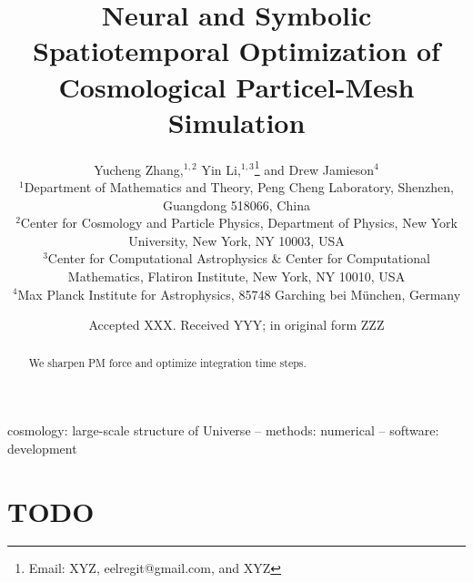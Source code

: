 \documentclass[usenatbib]{mnras}
\title[Spatiotemporally Optimized Simulation]
{Neural and Symbolic Spatiotemporal Optimization of Cosmological
Particel-Mesh Simulation}
\author[Zhang, Li, Jamieson, et al.]{
%
Yucheng Zhang,$^{1, 2}$
%
Yin Li,$^{1, 3}$\thanks{Email: XYZ, eelregit@gmail.com, and XYZ}
%
and Drew Jamieson$^{4}$
%
\\$^1$Department of Mathematics and Theory, Peng Cheng Laboratory,
Shenzhen, Guangdong 518066, China
%
\\$^2$Center for Cosmology and Particle Physics, Department of Physics,
New York University, New York, NY 10003, USA
%
\\$^3$Center for Computational Astrophysics \& Center for Computational
Mathematics, Flatiron Institute, New York, NY 10010, USA
%
\\$^4$Max Planck Institute for Astrophysics, 85748 Garching bei
M\"unchen, Germany
}
\date{Accepted XXX. Received YYY; in original form ZZZ}
\begin{document}
\label{firstpage}
\pagerange{\pageref{firstpage}--\pageref{lastpage}}
\maketitle



\begin{abstract}
We sharpen PM force and optimize integration time steps.
\end{abstract}

\begin{keywords}
cosmology: large-scale structure of Universe
-- methods: numerical
-- software: development
\end{keywords}



\section*{TODO}
\end{document}
